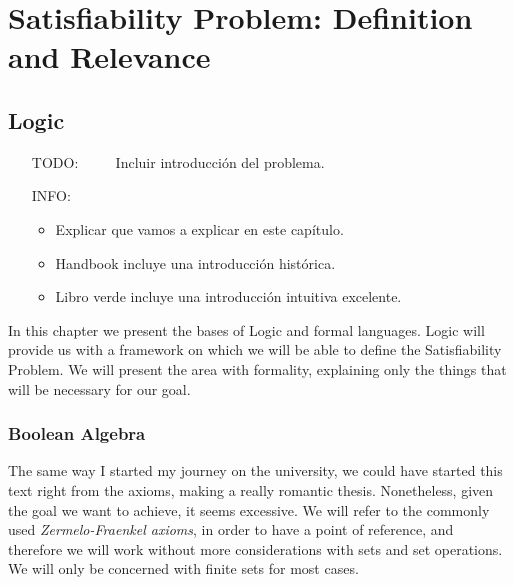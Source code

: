 
\part{Satisfiability Problem: Definition and Relevance} %

\label{Chapter1} %


\newcommand{\keyword}[1]{\textbf{#1}}
\newcommand{\tabhead}[1]{\textbf{#1}}
\newcommand{\code}[1]{\texttt{#1}}
\newcommand{\file}[1]{\texttt{\bfseries#1}}
\newcommand{\option}[1]{\texttt{\itshape#1}}


\chapter{Logic}

\begin{itemize}
\item[TODO:]$\qquad$ Incluir introducción del problema.

\item[INFO:]
  \begin{itemize}
  \item Explicar que vamos a explicar en este capítulo.
  \item Handbook incluye una introducción histórica.
  \item Libro verde incluye una introducción intuitiva excelente.
\end{itemize}
\end{itemize}


In this chapter we present the bases of Logic and formal languages. Logic will provide us with a framework on which we will be able to define the Satisfiability Problem. We will present the area with formality, explaining only the things that will be necessary for our goal.


\section{Boolean Algebra}

The same way I started my journey on the university, we could have started this text right from the axioms, making a really romantic thesis. Nonetheless, given the goal we want to achieve, it seems excessive. We will refer to the commonly used \emph{Zermelo-Fraenkel axioms}, in order to have a point of reference, and therefore we will work without more considerations with sets and set operations. We will only be concerned with finite sets for most cases.

